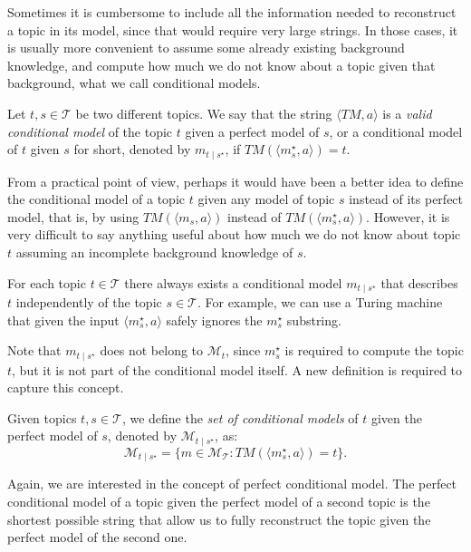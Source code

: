 Sometimes it is cumbersome to include all the information needed to reconstruct a topic in its model, since that would require very large strings. In those cases, it is usually more convenient to assume some already existing background knowledge, and compute how much we do not know about a topic given that background, what we call conditional models.

\begin{definition}
Let $t,s \in \mathcal{T}$ be two different topics. We say that the string $\langle TM,a \rangle$ is a \emph{valid conditional model} of the topic $t$ given a perfect model of $s$, or a conditional model of $t$ given $s$ for short, denoted by $m_{t \mid s^\star}$, if $TM \left(\langle m_s^\star, a \rangle \right) = t$.
\end{definition}

From a practical point of view, perhaps it would have been a better idea to define the conditional model of a topic $t$ given any model of topic $s$ instead of its perfect model, that is, by using $TM \left( \langle m_s, a \rangle \right)$ instead of $TM \left( \langle m_s^\star, a \rangle \right)$. However, it is very difficult to say anything useful about how much we do not know about topic $t$ assuming an incomplete background knowledge of $s$.

\begin{example}
For each topic $t \in \mathcal{T}$ there always exists a conditional model $m_{t \mid s^\star}$ that describes $t$ independently of the topic $s \in \mathcal{T}$. For example, we can use a Turing machine that given the input $\langle m_s^\star, a \rangle$ safely ignores the $m_s^\star$ substring.
\end{example}

Note that $m_{t \mid s^\star}$ does not belong to $\mathcal{M}_t$, since $m_s^\star$ is required to compute the topic $t$, but it is not part of the conditional model itself. A new definition is required to capture this concept.

\begin{definition}
Given topics $t,s \in \mathcal{T}$, we define the \emph{set of conditional models} of $t$ given the perfect model of $s$, denoted by $\mathcal{M}_{t \mid s^\star}$, as:
\[
\mathcal{M}_{t \mid s^\star} = \{ m \in \mathcal{M}_{\mathcal{T}} : TM \left(\langle m_s^\star, a \rangle \right) = t \}.
\]
\end{definition}

Again, we are interested in the concept of perfect conditional model. The perfect conditional model of a topic given the perfect model of a second topic is the shortest possible string that allow us to fully reconstruct the topic given the perfect model of the second one.

